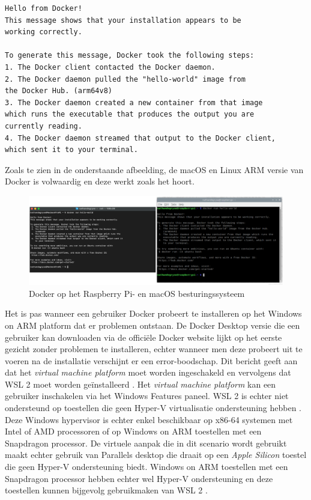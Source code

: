 \begin{lstlisting}
Hello from Docker!
This message shows that your installation appears to be 
working correctly.
	
To generate this message, Docker took the following steps:
1. The Docker client contacted the Docker daemon.
2. The Docker daemon pulled the "hello-world" image from 
the Docker Hub. (arm64v8)
3. The Docker daemon created a new container from that image 
which runs the executable that produces the output you are 
currently reading.
4. The Docker daemon streamed that output to the Docker client,
which sent it to your terminal.
\end{lstlisting}

\pagebreak
Zoals te zien in de onderstaande afbeelding, de macOS en Linux ARM versie van Docker is volwaardig en deze werkt zoals het hoort.

\begin{figure}[!h]
	\centering
	\includegraphics[width=\linewidth]{img/docker.png}
	\caption{Docker op het Raspberry Pi- en macOS besturingssysteem}
\end{figure}

Het is pas wanneer een gebruiker Docker probeert te installeren op het Windows on ARM platform dat er problemen ontstaan. De Docker Desktop versie die een gebruiker kan downloaden via de officiële Docker website lijkt op het eerste gezicht zonder problemen te installeren, echter wanneer men deze probeert uit te voeren na de installatie verschijnt er een error-boodschap. Dit bericht geeft aan dat het \textit{virtual machine platform} moet worden ingeschakeld en vervolgens dat WSL 2 moet worden geïnstalleerd \autocite{Docker2021}. Het \textit{virtual machine platform} kan een gebruiker inschakelen via het Windows Features paneel. WSL 2 is echter niet ondersteund op toestellen die geen Hyper-V virtualisatie ondersteuning hebben . Deze Windows hypervisor is echter enkel beschikbaar op x86-64 systemen met Intel of AMD processoren of op Windows on ARM toestellen met een Snapdragon processor. De virtuele aanpak die in dit scenario wordt gebruikt maakt echter gebruik van Parallels desktop die draait op een \textit{Apple Silicon} toestel die geen Hyper-V ondersteuning biedt. Windows on ARM toestellen met een Snapdragon processor hebben echter wel Hyper-V ondersteuning en deze toestellen kunnen bijgevolg gebruikmaken van WSL 2 \autocite{Maurer2020}.

